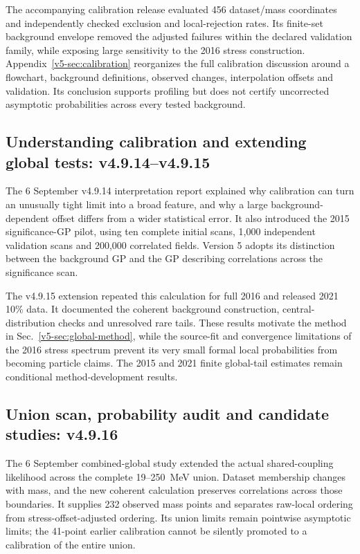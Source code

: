The accompanying calibration release evaluated 456 dataset/mass
coordinates and independently checked exclusion and local-rejection
rates. Its finite-set background envelope removed the adjusted failures
within the declared validation family, while exposing large sensitivity
to the 2016 stress construction. Appendix~\ref{v5-sec:calibration}
reorganizes the full calibration discussion around a flowchart,
background definitions, observed changes, interpolation offsets and
validation. Its conclusion supports profiling but does not certify
uncorrected asymptotic probabilities across every tested background.

\subsection{Understanding calibration and extending global tests: v4.9.14--v4.9.15}
The 6 September v4.9.14 interpretation report explained why calibration
can turn an unusually tight limit into a broad feature, and why a large
background-dependent offset differs from a wider statistical error.
It also introduced the 2015 significance-GP pilot, using ten complete
initial scans, 1,000 independent validation scans and 200,000 correlated
fields. Version 5 adopts its distinction between the background GP and
the GP describing correlations across the significance scan.

The v4.9.15 extension repeated this calculation for full 2016 and
released 2021 10\% data. It documented the coherent background
construction, central-distribution checks and unresolved rare tails.
These results motivate the method in Sec.~\ref{v5-sec:global-method},
while the source-fit and convergence limitations of the 2016 stress spectrum prevent
its very small formal local probabilities from becoming particle claims.
The 2015 and 2021 finite global-tail estimates remain conditional
method-development results.

\subsection{Union scan, probability audit and candidate studies: v4.9.16}
The 6 September combined-global study extended the actual shared-coupling
likelihood across the complete 19--250~MeV union. Dataset membership changes
with mass, and the new coherent calculation preserves correlations across
those boundaries. It supplies 232 observed mass points and separates
raw-local ordering from stress-offset-adjusted ordering. Its union limits
remain pointwise asymptotic limits; the 41-point earlier calibration
cannot be silently promoted to a calibration of the entire union.

